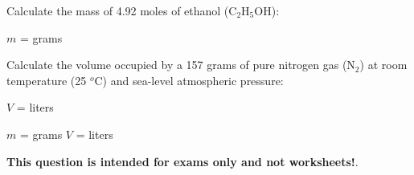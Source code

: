 

Calculate the mass of 4.92 moles of ethanol (C$_{2}$H$_{5}$OH):

\vskip 10pt

$m$ = \underbar{\hskip 50pt} grams

\vskip 20pt

Calculate the volume occupied by a 157 grams of pure nitrogen gas (N$_{2}$) at room temperature (25 $^{o}$C) and sea-level atmospheric pressure:

\vskip 10pt

$V$ = \underbar{\hskip 50pt} liters







$m$ =  grams  \hskip 30pt  $V$ =  liters







{\bf This question is intended for exams only and not worksheets!}.


